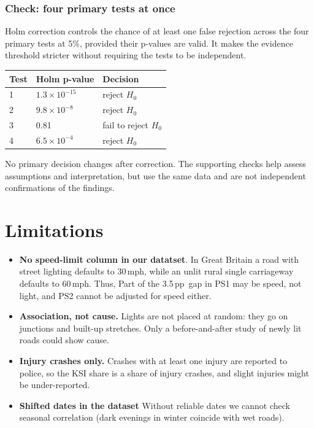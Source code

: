 \documentclass[10pt,a4paper,twocolumn]{article}
\newcommand{\pp}{\,pp}
\begin{document}
\subsubsection*{Check: four primary tests at once}
Holm correction controls the chance of at least one false rejection across the four primary
tests at 5\%, provided their p-values are valid. It makes the evidence threshold stricter
without requiring the tests to be independent.

{\small
\begin{tabularx}{\linewidth}{@{}L{1.3cm} L{2.1cm} Y@{}}
\toprule
\textbf{Test} & \textbf{Holm p-value} & \textbf{Decision} \\
 & $1.3\times10^{-15}$ & reject $H_0$ \\
2 & $9.8\times10^{-8}$ & reject $H_0$ \\
3 & 0.81 & fail to reject $H_0$ \\
4 & $6.5\times10^{-4}$ & reject $H_0$ \\
\bottomrule
\end{tabularx}}

No primary decision changes after correction. The supporting checks help assess assumptions
and interpretation, but use the same data and are not independent confirmations of the findings.

\section{Limitations}

\begin{itemize}
  \item \textbf{No speed-limit column in our datatset}. In Great
  Britain a road with street lighting defaults to 30\,mph, while an unlit rural single
  carriageway defaults to 60\,mph. Thus, Part of the 3.5\pp\ gap in PS1 may be speed, not light, and
  PS2 cannot be adjusted for speed either.
  \item \textbf{Association, not cause.} Lights are not placed at random: they go on junctions
  and built-up stretches. Only a before-and-after study of newly lit roads could show cause.
  \item \textbf{Injury crashes only.} Crashes with at least one injury are
  reported to police, so the KSI share is a share of injury crashes, and slight injuries might be
  under-reported.
  \item \textbf{Shifted dates in the dataset} Without reliable dates we cannot check seasonal correlation (dark
  evenings in winter coincide with wet roads).
\end{itemize}
\end{document}
